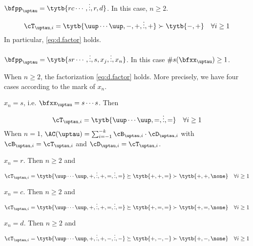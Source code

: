 \documentclass[ssunip]{subfiles}
\begin{document}
{\begin{enumT}
 \item $\bfpp_{\uptau} = \tytb{rc\cdots,\vdots,r,d}$.
 In this case, $n\geq 2$.
  \begin{equation}\label{eq:rd.c}
  \cT_{\uptau,i}  = \tytb{\uup\cdots\uup,-,+,\vdots,+} \succ \tytb{-,+} \quad  \forall i\geq 1
  \end{equation}
In particular, \eqref{eq:d.factor} holds.
 \item $\bfpp_{\uptau} = \tytb{sr\cdots,\vdots,s,{x_{j}},\vdots,{x_{n}}}$.
 In this case $\#s(\bfxx_{\uptau})\geq 1$.

 When $n\geq 2$, the factorization \eqref{eq:d.factor} holds.
 More precisely, we have four cases according to the mark of $x_{n}$.
 \begin{enumT}
   \item $x_{n}=s$, i.e. $\bfxx_{\uptau} = s\cdots s$. Then
   \[
  \cT_{\uptau,i}  = \tytb{\uup\cdots\uup,=,\vdots,=} \quad \forall i \geq 1
   \]
   When $n= 1$,
   $\oAC{\uptau} = \sum_{i=-1}^{-k} \cB_{\uptau,i}\cdot \cD_{\uptau,i}$
   with $\cB_{\uptau,i} = \cT_{\uptau,i}$ and $\cD_{\uptau,i} = \cT_{\uptau,i}$.
   \item $x_{n}=r$. Then $n\geq 2$ and
   \[
  \cT_{\uptau,i}  = \tytb{\uup\cdots\uup,+,\vdots,+,=,\vdots,=} \succeq \tytb{+,+,=}\succ \tytb{+,+,\none}
  \quad \forall i\geq 1
  \]
   \item $x_{n}=c$. Then $n\geq 2$ and
   \[
  \cT_{\uptau,i}  = \tytb{\uup\cdots\uup,+,\vdots,+,=,\vdots,=} \succeq \tytb{+,=,=}\succ \tytb{+,=,\none}
  \quad \forall i\geq 1
   \]
   \item $x_{n}=d$. Then $n\geq 2$ and
   \[
  \cT_{\uptau,i}  = \tytb{\uup\cdots\uup,+,\vdots,+,-,\vdots,-}  \succeq \tytb{+,-,-}\succ \tytb{+,-,\none}
  \quad \forall i\geq 1
   \]
 \end{enumT}


\end{enumT}}
\end{document}
